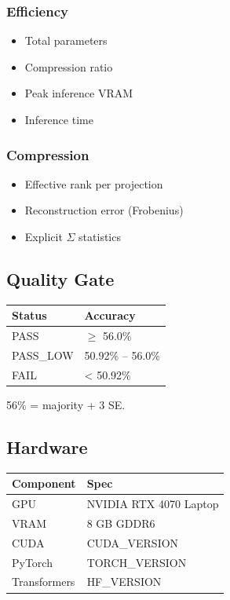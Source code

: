 \subsubsection{Efficiency}

\begin{itemize}
\item Total parameters
\item Compression ratio
\item Peak inference VRAM
\item Inference time

\end{itemize}
\subsubsection{Compression}

\begin{itemize}
\item Effective rank per projection
\item Reconstruction error (Frobenius)
\item Explicit $\Sigma$ statistics

\end{itemize}
\subsection{Quality Gate}

\begin{table}[H]
\centering
\small
\begin{tabular}{ll}
\toprule
\textbf{Status} & \textbf{Accuracy} \\
\midrule
PASS & $\ge$ 56.0\% \\
PASS\_LOW & 50.92\% -- 56.0\% \\
FAIL & < 50.92\% \\
\bottomrule
\end{tabular}
\end{table}

56\% = majority + 3 SE.

\subsection{Hardware}

\begin{table}[H]
\centering
\small
\begin{tabular}{ll}
\toprule
\textbf{Component} & \textbf{Spec} \\
\midrule
GPU & NVIDIA RTX 4070 Laptop \\
VRAM & 8 GB GDDR6 \\
CUDA & {{CUDA\_VERSION}} \\
PyTorch & {{TORCH\_VERSION}} \\
Transformers & {{HF\_VERSION}} \\
\bottomrule
\end{tabular}
\end{table}

